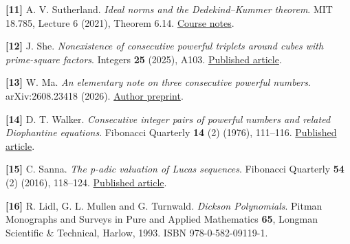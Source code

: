 \documentclass[11pt,a4paper]{article}
\begin{document}
\protect{}\label{reference-11}
\textbf{{[}11{]}} A. V. Sutherland. \emph{Ideal norms and the
Dedekind--Kummer theorem}. MIT 18.785, Lecture 6 (2021), Theorem 6.14.
\href{https://math.mit.edu/classes/18.785/2021fa/LectureNotes6.pdf}{Course
notes}.

\protect{}\label{reference-12}
\textbf{{[}12{]}} J. She. \emph{Nonexistence of consecutive powerful
triplets around cubes with prime-square factors}. Integers \textbf{25}
(2025), A103.
\href{https://math.colgate.edu/~integers/z103/z103.pdf}{Published
article}.

\protect{}\label{reference-13}
\textbf{{[}13{]}} W. Ma. \emph{An elementary note on three consecutive
powerful numbers}. arXiv:2608.23418 (2026).
\href{https://arxiv.org/abs/2608.23418}{Author preprint}.

\protect{}\label{reference-14}
\textbf{{[}14{]}} D. T. Walker. \emph{Consecutive integer pairs of
powerful numbers and related Diophantine equations}. Fibonacci Quarterly
\textbf{14} (2) (1976), 111--116.
\href{https://fq.math.ca/Scanned/14-2/walker.pdf}{Published article}.

\protect{}\label{reference-15}
\textbf{{[}15{]}} C. Sanna. \emph{The p-adic valuation of Lucas
sequences}. Fibonacci Quarterly \textbf{54} (2) (2016), 118--124.
\href{https://fq.math.ca/Papers1/54-2/Sanna02242016.pdf}{Published
article}.

\protect{}\label{reference-16}
\textbf{{[}16{]}} R. Lidl, G. L. Mullen and G. Turnwald. \emph{Dickson
Polynomials}. Pitman Monographs and Surveys in Pure and Applied
Mathematics \textbf{65}, Longman Scientific \& Technical, Harlow, 1993.
ISBN 978-0-582-09119-1.
\end{document}
